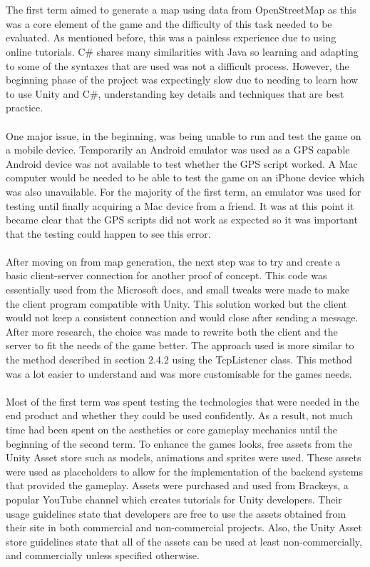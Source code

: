 \documentclass[a4paper]{report}
\begin{document}
\\\\
The first term aimed to generate a map using data from OpenStreetMap as this was a core element of the game and the difficulty of this task needed to be evaluated. As mentioned before, this was a painless experience due to using online tutorials. C\# shares many similarities with Java so learning and adapting to some of the syntaxes that are used was not a difficult process. However, the beginning phase of the project was expectingly slow due to needing to learn how to use Unity and C\#, understanding key details and techniques that are best practice. \cite{Sloan}
\\\\
One major issue, in the beginning, was being unable to run and test the game on a mobile device. Temporarily an Android emulator was used as a GPS capable Android device was not available to test whether the GPS script worked. A Mac computer would be needed to be able to test the game on an iPhone device which was also unavailable. For the majority of the first term, an emulator was used for testing until finally acquiring a Mac device from a friend. It was at this point it became clear that the GPS scripts did not work as expected so it was important that the testing could happen to see this error.
\\\\
After moving on from map generation, the next step was to try and create a basic client-server connection for another proof of concept. This code was essentially used from the Microsoft docs, and small tweaks were made to make the client program compatible with Unity. This solution worked but the client would not keep a consistent connection and would close after sending a message. After more research, the choice was made to rewrite both the client and the server to fit the needs of the game better. The approach used is more similar to the method described in section 2.4.2 using the TcpListener class. This method was a lot easier to understand and was more customisable for the games needs.
\\\\
Most of the first term was spent testing the technologies that were needed in the end product and whether they could be used confidently. As a result, not much time had been spent on the aesthetics or core gameplay mechanics until the beginning of the second term. To enhance the games looks, free assets from the Unity Asset store such as models, animations and sprites were used. These assets were used as placeholders to allow for the implementation of the backend systems that provided the gameplay. Assets were purchased and used from Brackeys, a popular YouTube channel which creates tutorials for Unity developers. Their usage guidelines state that developers are free to use the assets obtained from their site in both commercial and non-commercial projects. Also, the Unity Asset store guidelines state that all of the assets can be used at least non-commercially, and commercially unless specified otherwise. \cite{Brackeys}
\end{document}
